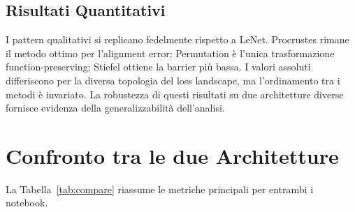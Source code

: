 \documentclass[11pt, a4paper]{article}
\begin{document}
\subsection{Risultati Quantitativi}

I pattern qualitativi si replicano fedelmente rispetto a LeNet. Procrustes rimane il metodo ottimo per l'alignment error; Permutation è l'unica trasformazione function-preserving; Stiefel ottiene la barrier più bassa. I valori assoluti differiscono per la diversa topologia del loss landscape, ma l'ordinamento tra i metodi è invariato. La robustezza di questi risultati su due architetture diverse fornisce evidenza della generalizzabilità dell'analisi.

\section{Confronto tra le due Architetture}

La Tabella~\ref{tab:compare} riassume le metriche principali per entrambi i notebook.

\begin{table}[h!]
\centering
\caption{Confronto LeNet vs.\ ResNet — metriche principali per ciascun metodo di allineamento.}
\label{tab:compare}
\end{table}
\end{document}
